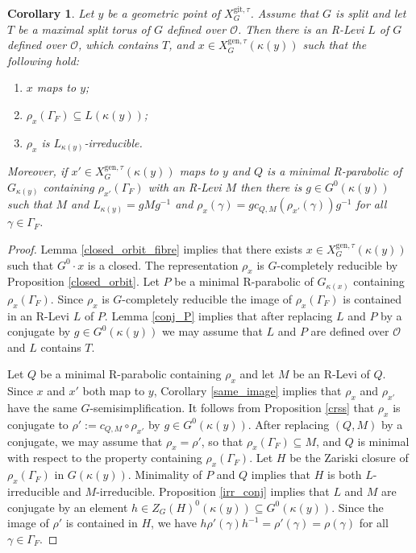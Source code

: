 \documentclass{amsart}
\newtheorem{cor}[prop]{Corollary}
\theoremstyle{definition}
\theoremstyle{remark}
\newcommand{\OO}{\mathcal O}
\newcommand{\gen}{\mathrm{gen}}
\newcommand{\gps}{\mathrm{git}}
\newcommand{\XgenGtau}{X^{\gen, \tau}_G}
\newcommand{\XgpsGtau}{X^{\gps, \tau}_{G}}
\begin{document}
\begin{cor}\label{conjugate_Levi} Let $y$ be a geometric point of $\XgpsGtau$. Assume that 
$G$ is split and let $T$ be  a maximal split torus of $G$ 
defined over $\OO$. Then there is an R-Levi $L$ of $G$ defined over $\OO$, which contains $T$, 
and $x\in \XgenGtau(\kappa(y))$ such that the following hold:
\begin{enumerate}
\item $x$ maps to $y$;
\item $\rho_x(\Gamma_F)\subseteq L(\kappa(y))$;
\item $\rho_x$ is $L_{\kappa(y)}$-irreducible.
\end{enumerate}
Moreover, if $x'\in \XgenGtau(\kappa(y))$ maps to $y$ and $Q$ is a minimal R-parabolic of $G_{\kappa(y)}$ 
containing $\rho_{x'}(\Gamma_F)$ with an R-Levi $M$ then there is $g\in G^0(\kappa(y))$ such that $M$ and $L_{\kappa(y)}= g M g^{-1}$ and $\rho_x(\gamma)= g c_{Q,M}(\rho_{x'}(\gamma))g^{-1}$ for all $\gamma\in \Gamma_F$.
\end{cor}
\begin{proof} Lemma \ref{closed_orbit_fibre} implies that there exists $x\in \XgenGtau(\kappa(y))$ such that $G^0 \cdot x$ is a closed. The representation $\rho_x$ is $G$-completely reducible by Proposition \ref{closed_orbit}. Let $P$ be a minimal R-parabolic of $G_{\kappa(x)}$ containing $\rho_x(\Gamma_F)$. 
Since $\rho_x$ is $G$-completely reducible the image of $\rho_x(\Gamma_F)$ is contained in an R-Levi 
$L$ of $P$. Lemma \ref{conj_P} implies that after replacing $L$ and $P$ by a conjugate by $g\in G^0(\kappa(y))$
we may assume that $L$ and $P$ are defined over $\OO$ and $L$ contains $T$. 

Let $Q$ be a minimal  R-parabolic containing $\rho_x$ and let $M$ be an R-Levi of $Q$. Since
$x$ and $x'$ both map to $y$, Corollary 
\ref{same_image} implies that $\rho_x$ and $\rho_{x'}$ have the same $G$-semisimplification. It follows from Proposition \ref{crss} that $\rho_x$ is conjugate to 
$\rho':=c_{Q, M}\circ \rho_{x'}$ by  $g\in G^0(\kappa(y))$. After replacing $(Q,M)$ by a conjugate, 
we may assume that $\rho_x=\rho'$, so that $\rho_x(\Gamma_F) \subseteq M$, and $Q$ is minimal with respect to the property containing $\rho_x(\Gamma_F)$. Let $H$ be the Zariski closure of $\rho_x(\Gamma_F)$ in $G(\kappa(y))$. 
Minimality of $P$ and $Q$ implies that $H$ is both $L$-irreducible and $M$-irreducible.
Proposition \ref{irr_conj} implies that $L$ and $M$ are conjugate by an 
element $h\in Z_{G}(H)^0(\kappa(y))\subseteq G^0(\kappa(y))$. Since the image of $\rho'$ is contained in $H$, 
we have $h \rho'(\gamma) h^{-1}= \rho'(\gamma) = \rho(\gamma)$ for all $\gamma\in \Gamma_F$.
\end{proof}
\end{document}
